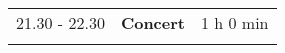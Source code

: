 \begin{longtable}{p{3cm}p{10cm}p{4cm}}
\vspace{1cm}
21.30 - 22.30 & {\bf Concert} & \hfill 1 h 0 min\\ 
\vspace{1cm}
\end{longtable}

